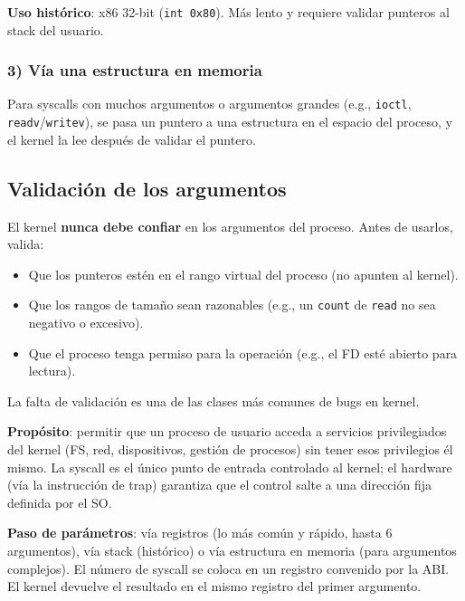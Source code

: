 \documentclass[11pt,a4paper]{article}
\begin{document}
\textbf{Uso histórico}: x86 32-bit (\texttt{int 0x80}). Más lento y
requiere validar punteros al stack del usuario.

\subsubsection*{3) Vía una estructura en memoria}

Para syscalls con muchos argumentos o argumentos grandes (e.g.,
\texttt{ioctl}, \texttt{readv}/\texttt{writev}), se pasa un puntero
a una estructura en el espacio del proceso, y el kernel la lee
después de validar el puntero.

\subsection*{Validación de los argumentos}

\begin{importante}
El kernel \textbf{nunca debe confiar} en los argumentos del proceso.
Antes de usarlos, valida:

\begin{itemize}[leftmargin=*,nosep]
    \item Que los punteros estén en el rango virtual del proceso
        (no apunten al kernel).
    \item Que los rangos de tamaño sean razonables (e.g., un
        \texttt{count} de \texttt{read} no sea negativo o
        excesivo).
    \item Que el proceso tenga permiso para la operación (e.g., el
        FD esté abierto para lectura).
\end{itemize}

La falta de validación es una de las clases más comunes de bugs en
kernel.
\end{importante}

\begin{respuesta}
\textbf{Propósito}: permitir que un proceso de usuario acceda a
servicios privilegiados del kernel (FS, red, dispositivos, gestión
de procesos) sin tener esos privilegios él mismo. La syscall es el
único punto de entrada controlado al kernel; el hardware (vía la
instrucción de trap) garantiza que el control salte a una dirección
fija definida por el SO.

\textbf{Paso de parámetros}: vía registros (lo más común y rápido,
hasta 6 argumentos), vía stack (histórico) o vía estructura en
memoria (para argumentos complejos). El número de syscall se coloca
en un registro convenido por la ABI. El kernel devuelve el
resultado en el mismo registro del primer argumento.
\end{respuesta}
\end{document}

